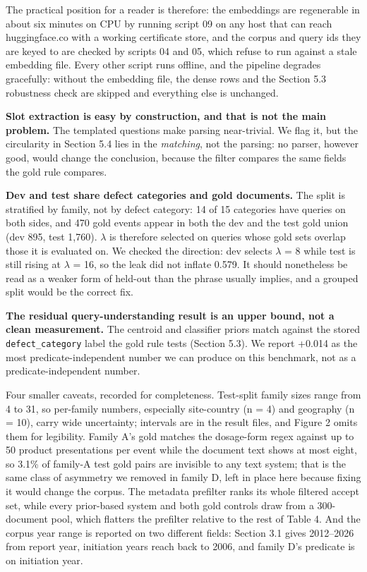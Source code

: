 \documentclass[runningheads]{llncs}
\begin{document}
The practical position for a reader is therefore: the embeddings are regenerable in about six minutes on CPU by running script 09 on any host that can reach huggingface.co with a working certificate store, and the corpus and query ids they are keyed to are checked by scripts 04 and 05, which refuse to run against a stale embedding file. Every other script runs offline, and the pipeline degrades gracefully: without the embedding file, the dense rows and the Section 5.3 robustness check are skipped and everything else is unchanged.

\textbf{Slot extraction is easy by construction, and that is not the main problem.} The templated questions make parsing near-trivial. We flag it, but the circularity in Section 5.4 lies in the \textit{matching}, not the parsing: no parser, however good, would change the conclusion, because the filter compares the same fields the gold rule compares.

\textbf{Dev and test share defect categories and gold documents.} The split is stratified by family, not by defect category: 14 of 15 categories have queries on both sides, and 470 gold events appear in both the dev and the test gold union (dev 895, test 1,760). $\lambda$ is therefore selected on queries whose gold sets overlap those it is evaluated on. We checked the direction: dev selects $\lambda$ = 8 while test is still rising at $\lambda$ = 16, so the leak did not inflate 0.579. It should nonetheless be read as a weaker form of held-out than the phrase usually implies, and a grouped split would be the correct fix.

\textbf{The residual query-understanding result is an upper bound, not a clean measurement.} The centroid and classifier priors match against the stored \texttt{defect\_category} label the gold rule tests (Section 5.3). We report +0.014 as the most predicate-independent number we can produce on this benchmark, not as a predicate-independent number.

Four smaller caveats, recorded for completeness. Test-split family sizes range from 4 to 31, so per-family numbers, especially site-country (n = 4) and geography (n = 10), carry wide uncertainty; intervals are in the result files, and Figure 2 omits them for legibility. Family A's gold matches the dosage-form regex against up to 50 product presentations per event while the document text shows at most eight, so 3.1\% of family-A test gold pairs are invisible to any text system; that is the same class of asymmetry we removed in family D, left in place here because fixing it would change the corpus. The metadata prefilter ranks its whole filtered accept set, while every prior-based system and both gold controls draw from a 300-document pool, which flatters the prefilter relative to the rest of Table 4. And the corpus year range is reported on two different fields: Section 3.1 gives 2012--2026 from report year, initiation years reach back to 2006, and family D's predicate is on initiation year.
\end{document}
